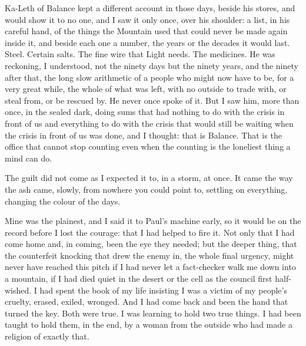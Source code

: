 Ka-Leth of Balance kept a different account in those days, beside his stores, and would show it to no one, and I saw it only once, over his shoulder: a list, in his careful hand, of the things the Mountain used that could never be made again inside it, and beside each one a number, the years or the decades it would last. Steel. Certain salts. The fine wire that Light needs. The medicines. He was reckoning, I understood, not the ninety days but the ninety years, and the ninety after that, the long slow arithmetic of a people who might now have to be, for a very great while, the whole of what was left, with no outside to trade with, or steal from, or be rescued by. He never once spoke of it. But I saw him, more than once, in the sealed dark, doing sums that had nothing to do with the crisis in front of us and everything to do with the crisis that would still be waiting when the crisis in front of us was done, and I thought: that is Balance. That is the office that cannot stop counting even when the counting is the loneliest thing a mind can do.\par

\ornament

The guilt did not come as I expected it to, in a storm, at once. It came the way the ash came, slowly, from nowhere you could point to, settling on everything, changing the colour of the days.\par

Mine was the plainest, and I said it to Paul's machine early, so it would be on the record before I lost the courage: that I had helped to fire it. Not only that I had come home and, in coming, been the eye they needed; but the deeper thing, that the counterfeit knocking that drew the enemy in, the whole final urgency, might never have reached this pitch if I had never let a fact-checker walk me down into a mountain, if I had died quiet in the desert or the cell as the council first half-wished. I had spent the book of my life insisting I was a victim of my people's cruelty, erased, exiled, wronged. And I had come back and been the hand that turned the key. Both were true. I was learning to hold two true things. I had been taught to hold them, in the end, by a woman from the outside who had made a religion of exactly that.\par

